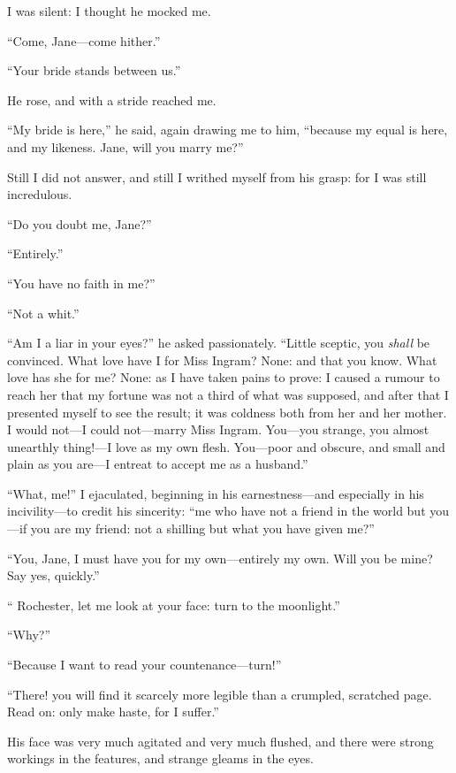 I was silent: I thought he mocked me.

\enquote{Come, Jane---come hither.}

\enquote{Your bride stands between us.}

He rose, and with a stride reached me.

\enquote{My bride is here,} he said, again drawing me to him,
\enquote{because my equal is here, and my likeness. Jane, will you
marry me?}

Still I did not answer, and still I writhed myself from his grasp: for I
was still incredulous.

\enquote{Do you doubt me, Jane?}

\enquote{Entirely.}

\enquote{You have no faith in me?}

\enquote{Not a whit.}

\enquote{Am I a liar in your eyes?} he asked passionately. \enquote{Little
sceptic, you \emph{shall} be convinced. What love have I for Miss
Ingram? None: and that you know. What love has she for me? None: as I
have taken pains to prove: I caused a rumour to reach her that my
fortune was not a third of what was supposed, and after that I presented
myself to see the result; it was coldness both from her and her mother. 
I would not---I could not---marry Miss Ingram. You---you strange, you
almost unearthly thing!---I love as my own flesh. You---poor and
obscure, and small and plain as you are---I entreat to accept me as a
husband.}

\enquote{What, me!} I ejaculated, beginning in his earnestness---and
especially in his incivility---to credit his sincerity: \enquote{me who
have not a friend in the world but you---if you are my friend: not a
shilling but what you have given me?}

\enquote{You, Jane, I must have you for my own---entirely my own. Will
you be mine? Say yes, quickly.}

\enquote{\Mr{} Rochester, let me look at your face: turn to the
moonlight.}

\enquote{Why?}

\enquote{Because I want to read your countenance---turn!}

\enquote{There! you will find it scarcely more legible than a crumpled,
scratched page. Read on: only make haste, for I suffer.}

His face was very much agitated and very much flushed, and there were
strong workings in the features, and strange gleams in the eyes.

